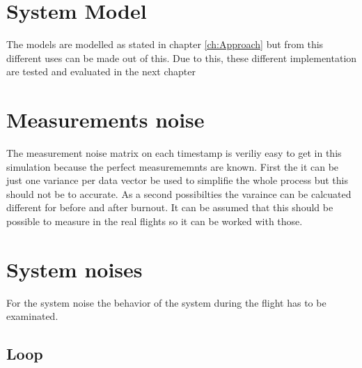 \section{System Model}
The models are modelled as stated in chapter \ref{ch:Approach} but from this different uses can be made out of this.
Due to this, these different implementation are tested and evaluated in the next chapter 

\section{Measurements noise}
The measurement noise matrix on each timestamp is veriliy easy to get in this simulation because the perfect measurememnts are known.
First the it can be just one variance per data vector be used to simplifie the whole process but this should not be to accurate.
As a second possibilties the varaince can be calcuated different for before and after burnout.
It can be assumed that this should be possible to measure in the real flights so it can be worked with those.


\section{System noises}
For the system noise the behavior of the system during the flight has to be examinated.



\subsection{Loop}
